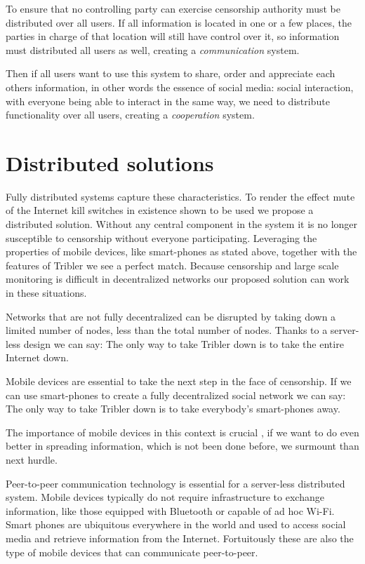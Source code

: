 
To ensure that no controlling party can exercise censorship authority must be distributed over all users. %
If all information is located in one or a few places, the parties in charge of that location will still have control over it, so information must distributed all users as well, creating a \emph{communication} system.

Then if all users want to use this system to share, order and appreciate each others information, in other words the essence of social media: social interaction, with everyone being able to interact in the same way, we need to  distribute functionality over all users, creating a \emph{cooperation} system.


\section{Distributed solutions}
Fully distributed systems capture these characteristics.
To render the effect mute of the Internet kill switches in existence shown to be used we propose a distributed solution.
Without any central component in the system it is no longer susceptible to censorship without everyone participating.
Leveraging the properties of mobile devices, like smart-phones as stated above, together with the features of Tribler we see a perfect match.
Because censorship and large scale monitoring is difficult in decentralized networks our proposed solution can work in these situations.

Networks that are not fully decentralized can be disrupted by taking down a limited number of nodes, less than the total number of nodes.
Thanks to a server-less design we can say:
The only way to take Tribler down is to take the entire Internet down.

Mobile devices are essential to take the next step in the face of censorship.
If we can use smart-phones to create a fully decentralized social network we can say:
The only way to take Tribler down is to take everybody's smart-phones away.

The importance of mobile devices in this context is crucial , if we want to do even better in spreading information, which is not been done before, we surmount than next hurdle.

Peer-to-peer communication technology is essential for a server-less distributed system.
Mobile devices typically do not require infrastructure to exchange information, like those equipped with Bluetooth or capable of ad hoc Wi-Fi.
Smart phones are ubiquitous everywhere in the world and used to access social media and retrieve information from the Internet.
Fortuitously these are also the type of mobile devices that can communicate peer-to-peer.

